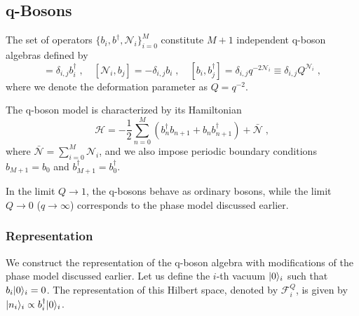 \documentclass[a4paper,11pt]{amsart}
\begin{document}
\subsection{q-Bosons}
The set of operators \(\{b_i, b^\dagger,\mathcal{N}_i\}_{i=0}^M\) constitute
\(M+1\) independent q-boson algebras defined by
\begin{equation}
[\mathcal{N}_i, b_j^\dagger]=\delta_{i,j} b_i^\dagger\; , \quad 
[\mathcal{N}_i, b_j]=-\delta_{i,j}b_i\; , \quad
[b_i, b_j^\dagger]= \delta_{i,j} q^{-2\mathcal{N}_i}  \equiv \delta_{i,j} Q^{\mathcal{N}_i}\; , 
\end{equation}
where we denote the deformation parameter as \(Q = q^{-2}\).

The q-boson model is characterized by its Hamiltonian
\begin{equation}
  \mathcal{H} = -\frac{1}{2} \sum_{n=0}^M
  \left(b_n^\dagger b_{n+1} + b_n b_{n+1}^\dagger \right) + \bar{\mathcal{N}}\; ,
\end{equation}
where \(\bar{\mathcal{N}} = \sum_{i=0}^M \mathcal{N}_i\), and we also
impose periodic boundary conditions \(b_{M+1} = b_0\) and
\(b_{M+1}^\dagger = b_0^\dagger\).

In the limit \(Q \to 1\), the q-bosons behave as ordinary bosons,
while the limit \(Q \to 0\) (\(q \to \infty\)) corresponds to the
phase model discussed earlier.


\subsubsection{Representation}
We construct the representation of the q-boson algebra with
modifications of the phase model discussed earlier. Let us define the
\(i\)-th vacuum \(\lvert0\rangle_i\) such that \(b_i\lvert0\rangle_i = 0\). The
representation of this Hilbert space, denoted by \(\mathcal{F}_i^Q\),
is given by \(\lvert n_i\rangle_i \propto b_i^\dagger \lvert0\rangle_i\).
\end{document}
